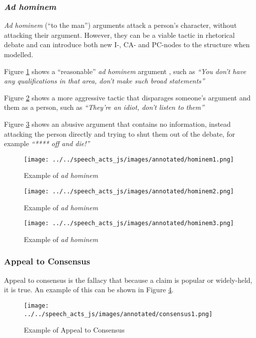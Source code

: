 \subsubsection{\textit{Ad hominem}}
\textit{Ad hominem} (``to the man'') arguments attack a person's character, without attacking their argument. However, they can be a viable tactic in rhetorical debate and can introduce both new I-, CA- and PC-nodes to the structure when modelled.

Figure \ref{figure:app_hominem1} shows a ``reasonable'' \textit{ad hominem} argument \citep{walton1987}, such as \textit{``You don't have any qualifications in that area, don't make such broad statements''}

Figure \ref{figure:app_hominem2} shows a more aggressive tactic that disparages someone's argument and them as a person, such as \textit{``They're an idiot, don't listen to them''}

Figure \ref{figure:app_hominem3} shows an abusive argument that contains no information, instead attacking the person directly and trying to shut them out of the debate, for example \textit{``**** off and die!''}

\begin{figure}[H]
\centering
\texttt{[image: ../../speech\_acts\_js/images/annotated/hominem1.png]}
\caption{Example of \textit{ad hominem}}
\label{figure:app_hominem1}
\end{figure}

\begin{figure}[H]
\centering
\texttt{[image: ../../speech\_acts\_js/images/annotated/hominem2.png]}
\caption{Example of \textit{ad hominem}}
\label{figure:app_hominem2}
\end{figure}

\begin{figure}[H]
\centering
\texttt{[image: ../../speech\_acts\_js/images/annotated/hominem3.png]}
\caption{Example of \textit{ad hominem}}
\label{figure:app_hominem3}
\end{figure}

\subsubsection{Appeal to Consensus}
Appeal to consensus is the fallacy that because a claim is popular or widely-held, it is true. An example of this can be shown in Figure \ref{figure:app_consensus1}.

\begin{figure}[H]
\centering
\texttt{[image: ../../speech\_acts\_js/images/annotated/consensus1.png]}
\caption{Example of Appeal to Consensus}
\label{figure:app_consensus1}
\end{figure}

